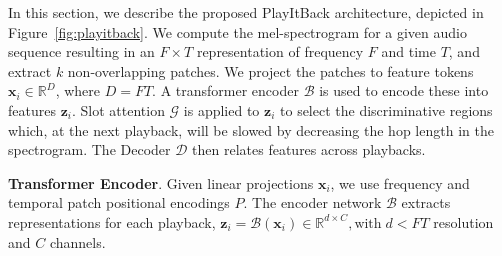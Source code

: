 \documentclass{article}
\begin{document}
In this section, we describe the proposed PlayItBack architecture, depicted in Figure~\ref{fig:playitback}. We compute the mel-spectrogram for a given audio sequence resulting in an $F \! \times \! T$ representation of frequency $F$ and time $T$, and extract $k$ non-overlapping patches. We project the patches to feature tokens $\mathbf{x}_i \!\! \in \!\! \mathbb{R}^{D}$, where $D \! = \! FT$. A transformer encoder $\mathcal{B}$ is used to encode these into features $\mathbf{z}_{i}$. Slot attention $\mathcal{G}$ is applied to $\mathbf{z}_{i}$ to select the discriminative regions which, at the next playback, will be slowed by decreasing the hop length in the spectrogram. The Decoder $\mathcal{D}$ then relates features across playbacks.



\noindent
\textbf{Transformer Encoder}. Given linear projections $\mathbf{x}_i$, we use frequency and temporal patch positional encodings $P$. The encoder network $\mathcal{B}$ extracts representations for each playback, $\mathbf{z}_i \! = \! \mathcal{B}(\mathbf{x}_i) \! \in \! \mathbb{R}^{d \times C}, \text{with} \; d \! < \!\! FT$ resolution and $C$ channels. 
\end{document}
